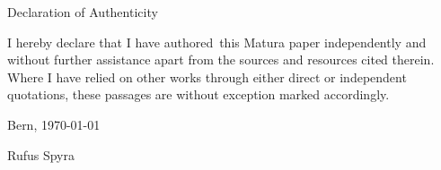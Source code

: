 Declaration of Authenticity

I hereby declare that I have authored this Matura paper independently and without further assistance apart from the sources and resources cited therein. Where I have relied on other works through either direct or independent quotations, these passages are without exception marked accordingly.

Bern, \today \vspace{2cm}

Rufus Spyra